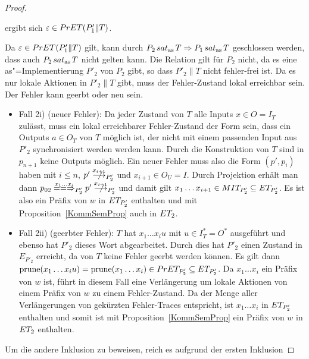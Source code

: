 \begin{proof}
\begin{itemize}
\begin{itemize}
          ergibt sich $\varepsilon \in PrET (P'_1\|T)$.
      \end{itemize}
      Da $\varepsilon\in PrET (P'_1\|T)$ gilt, kann durch $P_2\hspace{0.05cm}sat_\mathrm{as}\hspace{0.05cm} T
      \Rightarrow P_1\hspace{0.05cm}sat_\mathrm{as}\hspace{0.05cm} T$ geschlossen werden, dass auch $P_2\hspace{0.05cm}sat_\mathrm{as}\hspace{0.05cm} T$
      nicht gelten kann. Die Relation gilt für $P_2$ nicht, da es eine
      as"=Implementierung $P'_2$ von $P_2$ gibt, so dass $P'_2\|T$ nicht
      fehler-frei ist. Da es nur lokale Aktionen in $P'_2\|T$ gibt, muss der
      Fehler-Zustand lokal erreichbar sein.\\
      Der Fehler kann geerbt oder neu sein.
      \begin{itemize}
        \item Fall 2i) (neuer Fehler): Da jeder Zustand von $T$ alle Inputs
          $x\in O=I_T$ zulässt, muss ein lokal erreichbarer Fehler-Zustand der
          Form sein, dass ein Outputs $a\in O_T$ von $T$ möglich ist, der nicht
          mit einem passenden Input aus $P'_2$ synchronisiert werden werden
          kann. Durch die Konstruktion von $T$ sind in $p_{n+1}$ keine Outputs
          möglich. Ein neuer Fehler muss also die Form $(p',p_i)$ haben mit
          $i\leq n$, $p'\nmust[x_{i+1}]_{P'_2}$ und $x_{i+1}\in O_U=I$. Durch
          Projektion erhält man dann $p_{02} \lweakmay[x_1\dots x_i]_{P'_2} p'
          \nmust[x_{i+1}]_{P'_2}$ und damit gilt $x_1\dots x_{i+1}\in MIT
          _{P'_2} \subseteq ET _{P'_2}$. Es ist also ein Präfix von $w$ in
          $ET _{P'_2}$ enthalten und mit Proposition~\ref{KommSemProp} auch in
          $ET _2$.
        \item Fall 2ii) (geerbter Fehler): $T$ hat $x_1\dots x_i u$ mit $u\in
          I^*_T =O^*$ ausgeführt und ebenso hat $P'_2$ dieses Wort
          abgearbeitet. Durch dies hat $P'_2$ einen Zustand in $E _{P'_2}$
          erreicht, da von $T$ keine Fehler geerbt werden können. Es gilt dann
          $\mathrm{prune} (x_1\dots x_iu) = \mathrm{prune} (x_1\dots x_i)\in PrET _{P'_2}
          \subseteq ET _{P'_2}$. Da $x_1\dots x_i$ ein Präfix von $w$ ist,
          führt in diesem Fall eine Verlängerung um lokale Aktionen von einem
          Präfix von $w$ zu einem Fehler-Zustand. Da \ET{} der Menge aller
          Verlängerungen von gekürzten Fehler-Traces entspricht, ist $x_1\dots
          x_i$ in $ET _{P'_2}$ enthalten und somit ist mit
          Proposition~\ref{KommSemProp} ein Präfix von $w$ in $ET _2$
          enthalten.
      \end{itemize}
  \end{itemize}
  Um die andere Inklusion zu beweisen, reich es aufgrund der ersten Inklusion

\end{proof}
